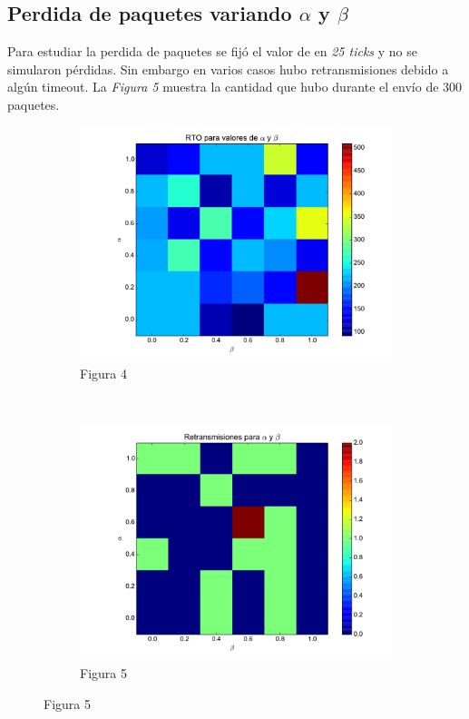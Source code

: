     \subsection{Perdida de paquetes variando $\alpha$ y $\beta$}
        Para estudiar la perdida de paquetes se fij\'o el valor
        de \rto{} en \textit{25 ticks} y no se simularon p\'erdidas.
        Sin embargo en varios casos hubo retransmisiones debido a alg\'un timeout.
		La \textit{Figura 5} muestra la cantidad que hubo durante el env\'io de 300
		paquetes.        
    \begin{figure}[H]
	    \center
	    \begin{subfigure}{0.45\textwidth}
		    \includegraphics[width=1.0\textwidth]{imagenes/rto_vs_alphaBeta.pdf}
		    \caption*{Figura 4}
	    \end{subfigure}
	    ~
	    \begin{subfigure}{0.45\textwidth}
		    \includegraphics[width=1.0\textwidth]{imagenes/retransmisiones_300.pdf}
		    \caption*{Figura 5}
	    \end{subfigure}
    \end{figure}

